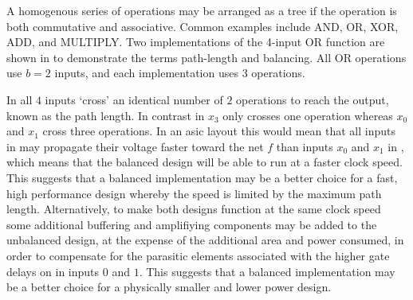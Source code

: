 \documentclass[11pt,twoside]{article}
\begin{document}
A homogenous series of operations may be arranged as a tree if the operation is
both commutative and associative.
Common examples include AND, OR, XOR, ADD, and MULTIPLY.
Two implementations of the 4-input OR function are shown in 
to demonstrate the terms path-length and balancing.
All OR operations use $b=2$ inputs, and each implementation uses $3$
operations.

In  all $4$ inputs `cross' an identical
number of $2$ operations to reach the output, known as the path length.
In contrast in  $x_3$ only crosses one
operation whereas $x_0$ and $x_1$ cross three operations.
In an \gls{asic} layout this would mean that all inputs in
 may propagate their voltage faster toward the net
$f$ than inputs $x_0$ and $x_1$ in , which means that
the balanced design will be able to run at a faster clock speed.
This suggests that a balanced implementation may be a better choice for a fast,
high performance design whereby the speed is limited by the maximum path length.
Alternatively, to make both designs function at the same clock speed some
additional buffering and amplifiying components may be added to the unbalanced
design, at the expense of the additional area and power consumed, in order to
compensate for the parasitic elements associated with the higher gate delays on
in inputs $0$ and $1$.
This suggests that a balanced implementation may be a better choice for a
physically smaller and lower power design.
\end{document}
